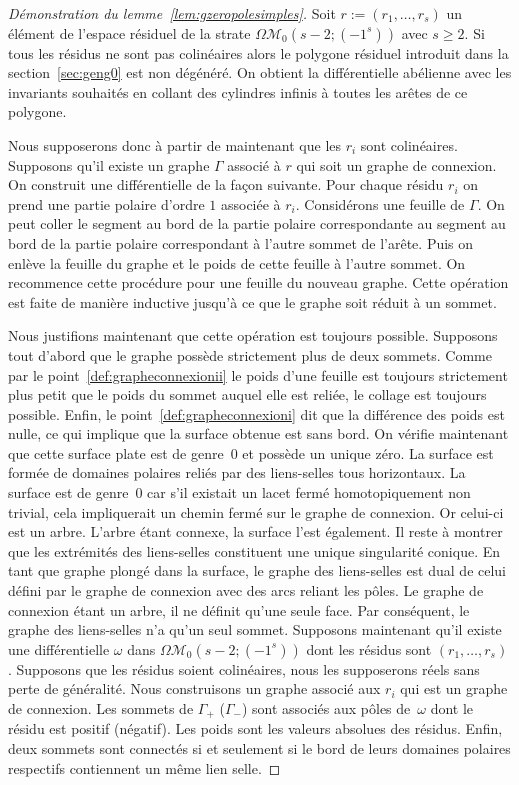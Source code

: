 \documentclass[JEP,XML,SOM,Unicode,francais,NoFloatCountersInSection,published]{cedram}
\let\mathcal\mathscr
\newcommand{\omoduli}[1][g]{{\Omega\mathcal M}_{\!#1}}
\theoremstyle{definition}
\begin{document}
\begin{proof}[Démonstration du lemme~\ref{lem:gzeropolesimples}]
Soit $r:=(r_{1},\dots,r_{s})$ un élément de l'espace résiduel de la strate $\omoduli[0](s-2;(-1^{s}))$ avec $s\geq2$. Si tous les résidus ne sont pas colinéaires alors le polygone résiduel introduit dans la section~\ref{sec:geng0} est non dégénéré. On obtient la différentielle abélienne avec les invariants souhaités en collant des cylindres infinis à toutes les arêtes de ce polygone.

Nous supposerons donc à partir de maintenant que les $r_{i}$ sont colinéaires. Supposons qu'il existe un graphe $\Gamma$ associé à $r$ qui soit un graphe de connexion. On construit une différentielle de la façon suivante. Pour chaque résidu $r_{i}$ on prend une partie polaire d'ordre $1$ associée à $r_{i}$. Considérons une feuille de $\Gamma$. On peut coller le segment au bord de la partie polaire correspondante au segment au bord de la partie polaire correspondant à l'autre sommet de l'arête. Puis on enlève la feuille du graphe et le poids de cette feuille à l'autre sommet. On recommence cette procédure pour une feuille du nouveau graphe. Cette opération est faite de manière inductive jusqu'à ce que le graphe soit réduit à un sommet.

Nous justifions maintenant que cette opération est toujours possible. Supposons tout d'abord que le graphe possède strictement plus de deux sommets. Comme par le point~\eqref{def:grapheconnexionii} le poids d'une feuille est toujours strictement plus petit que le poids du sommet auquel elle est reliée, le collage est toujours possible. Enfin, le point~\eqref{def:grapheconnexioni} dit que la différence des poids est nulle, ce qui implique que la surface obtenue est sans bord. On vérifie maintenant que cette surface plate est de genre~$0$ et possède un unique zéro. La surface est formée de domaines polaires reliés par des liens-selles tous horizontaux. La surface est de genre~$0$ car s'il existait un lacet fermé homotopiquement non trivial, cela impliquerait un chemin fermé sur le graphe de connexion. Or celui-ci est un arbre. L'arbre étant connexe, la surface l'est également. Il reste à montrer que les extrémités des liens-selles constituent une unique singularité conique. En tant que graphe plongé dans la surface, le graphe des liens-selles est dual de celui défini par le graphe de connexion avec des arcs reliant les pôles. Le graphe de connexion étant un arbre, il ne définit qu'une seule face. Par conséquent, le graphe des liens-selles n'a qu'un seul sommet.
Supposons maintenant qu'il existe une différentielle $\omega$ dans $\omoduli[0](s-2;(-1^{s}))$ dont les résidus sont $(r_{1},\dots,r_{s})$. Supposons que les résidus soient colinéaires, nous les supposerons réels sans perte de généralité. Nous construisons un graphe associé aux $r_{i}$ qui est un graphe de connexion. Les sommets de $\Gamma_{+}$ (\resp $\Gamma_{-}$) sont associés aux pôles de~$\omega$ dont le résidu est positif (\resp négatif). Les poids sont les valeurs absolues des résidus. Enfin, deux sommets sont connectés si et seulement si le bord de leurs domaines polaires respectifs contiennent un même lien selle.


\end{proof}
\end{document}
